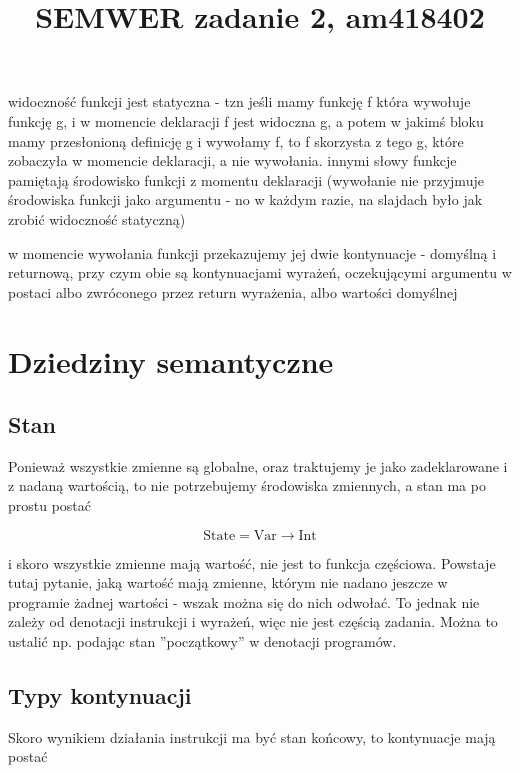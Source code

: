 \documentclass[a4paper]{article}
\begin{document}
\title{SEMWER zadanie 2, am418402}

\maketitle

widoczność funkcji jest statyczna - tzn jeśli mamy funkcję f która wywołuje funkcję g, i w momencie deklaracji f jest widoczna g, a potem w jakimś bloku mamy przesłonioną definicję g i wywołamy f, to f skorzysta z tego g, które zobaczyła w momencie deklaracji, a nie wywołania. innymi słowy funkcje pamiętają środowisko funkcji z momentu deklaracji (wywołanie nie przyjmuje środowiska funkcji jako argumentu - no w każdym razie, na slajdach było jak zrobić widoczność statyczną)

w momencie wywołania funkcji przekazujemy jej dwie kontynuacje - domyślną i returnową, przy czym obie są kontynuacjami wyrażeń, oczekującymi argumentu w postaci albo zwróconego przez return wyrażenia, albo wartości domyślnej


\section*{Dziedziny semantyczne}

\subsection*{Stan}

Ponieważ wszystkie zmienne są globalne, oraz traktujemy je jako zadeklarowane i z nadaną wartością, to nie potrzebujemy środowiska zmiennych, a stan ma po prostu postać

$$
\text{State} = \text{Var} \longrightarrow \text{Int}
$$

i skoro wszystkie zmienne mają wartość, nie jest to funkcja częściowa. Powstaje tutaj pytanie, jaką wartość mają zmienne, którym nie nadano jeszcze w programie żadnej wartości - wszak można się do nich odwołać. To jednak nie zależy od denotacji instrukcji i wyrażeń, więc nie jest częścią zadania. Można to ustalić np. podając stan ''początkowy'' w denotacji programów.

\subsection*{Typy kontynuacji}

Skoro wynikiem działania instrukcji ma być stan końcowy, to kontynuacje mają postać
\end{document}
